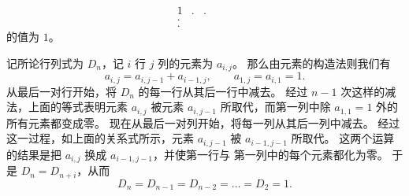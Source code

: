 \begin{exercises}
\begin{equation*}
\begin{array}{cccccc}
        1  &.  &.  &   &   &   \\
        .                      \\
        .
      \end{array}
    \end{equation*}
    的值为 $1$。
    \begin{answer}
      \answerasgiven
      记所论行列式为 \( D_n \)，记
      \( i \) 行 \( j \) 列的元素为 \( a_{i,j} \)。
      那么由元素的构造法则我们有
      \begin{equation*}
        a_{i,j}=a_{i,j-1}+a_{i-1,j},
        \qquad a_{1,j}=a_{i,1}=1.
      \end{equation*}
      从最后一对行开始，将 \( D_n \) 的每一行从其后一行中减去。
      经过 \( n-1 \) 次这样的减法，上面的等式表明元素
      \( a_{i,j} \) 被元素 \( a_{i,j-1} \) 所取代，而第一列中除
      \( a_{1,1}=1 \) 外的所有元素都变成零。
      现在从最后一对列开始，将每一列从其后一列中减去。
      经过这一过程，如上面的关系式所示，元素 \( a_{i,j-1} \) 被
      \( a_{i-1,j-1} \) 所取代。
      这两个运算的结果是把 \( a_{i,j} \) 换成
      \( a_{i-1,j-1} \)，并使第一行与
      第一列中的每个元素都化为零。
      于是 \( D_n=D_{n+i} \)，从而
      \begin{equation*}
        D_n=D_{n-1}=D_{n-2}=\dots=D_2=1.
      \end{equation*}
    \end{answer}
\end{exercises}

